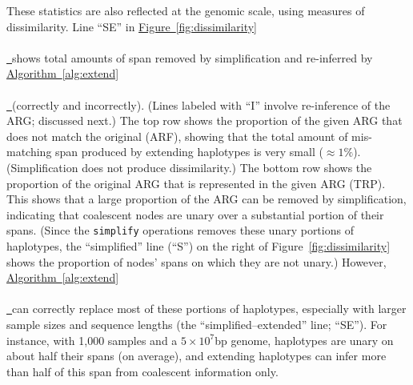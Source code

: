 \documentclass[10pt,twoside,lineno]{gsajnl}
\newcommand{\algorithmref}[2][]{%
	\hyperref[{#2}]{%
		Algorithm~\ref*{#2}%
		\ifx\\#1\\%
		\else
		\,#1%
		\fi
	}%
}
\newcommand*{\figref}[2][]{%
	\hyperref[{#2}]{%
		Figure~\ref*{#2}%
		\ifx\\#1\\%
		\else
		\,#1%
		\fi
	}%
}
\begin{document}
These statistics are also reflected at the genomic scale, using measures of dissimilarity.
Line ``SE'' in \figref{fig:dissimilarity} shows total amounts of span removed by simplification
and re-inferred by \algorithmref{alg:extend} (correctly and incorrectly).
(Lines labeled with ``I'' involve re-inference of the ARG; discussed next.)
The top row shows the proportion of the given ARG that does not match the original (ARF),
showing that the total amount of mis-matching span
produced by extending haplotypes is very small ($\approx 1\%$).
(Simplification does not produce dissimilarity.)
The bottom row shows the proportion of the original ARG that is represented in the given ARG (TRP).
This shows that a large proportion of the ARG can be removed by simplification,
indicating that coalescent nodes are unary
over a substantial portion of their spans.
(Since the \texttt{simplify} operations removes these unary portions of haplotypes,
the ``simplified'' line (``S'') on the right of Figure~\ref{fig:dissimilarity} shows
the proportion of nodes' spans on which they are not unary.)
However, \algorithmref{alg:extend} can correctly replace most of these portions of haplotypes,
especially with larger sample sizes and sequence lengths
(the ``simplified--extended'' line; ``SE'').
For instance, with 1,000 samples and a $5 \times 10^7$bp genome,
haplotypes are unary on about half their spans (on average),
and extending haplotypes can infer more than half of this span from coalescent information only.
\end{document}
